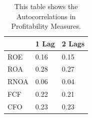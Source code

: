 {{\begin{table}[htb!]
\centering
{}
\caption{This table shows the Pearson correlations for CFO features in our sample.}
\label{tab:CFOCorr}
\end{table}

\begin{table}[htb!]
\centering
\begin{tabular}{|l|l|l|}
\hline
     & 1 Lag & 2 Lags \\ \hline
ROE  & 0.16  & 0.15   \\ \hline
ROA  & 0.28  & 0.27   \\ \hline
RNOA & 0.06  & 0.04   \\ \hline
FCF  & 0.22  & 0.21   \\ \hline
CFO  & 0.23  & 0.23   \\ \hline
\end{tabular}
\caption{This table shows the Autocorrelations in Profitability Measures.}
\label{tab:AutCorrProfitability}
\end{table}

}}
